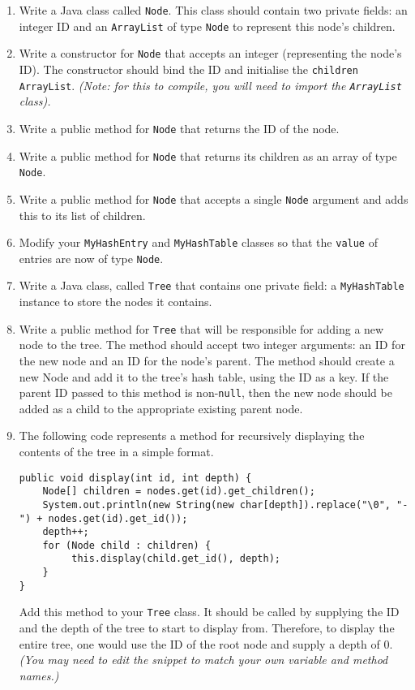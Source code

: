 \documentclass[11pt,a4paper]{report}
\begin{document}
\begin{enumerate}

\item Write a Java class called \texttt{Node}. This class should contain two private fields: an integer ID and an \texttt{ArrayList} of type \texttt{Node} to represent this node's children.

\item Write a constructor for \texttt{Node} that accepts an integer (representing the node's ID). The constructor should bind the ID and initialise the \texttt{children} \texttt{ArrayList}. \textit{(Note: for this to compile, you will need to import the \texttt{ArrayList} class).}

\item Write a public method for \texttt{Node} that returns the ID of the node.

\item Write a public method for \texttt{Node} that returns its children as an array of type \texttt{Node}.

\item Write a public method for \texttt{Node} that accepts a single \texttt{Node} argument and adds this to its list of children.

\item Modify your \texttt{MyHashEntry} and \texttt{MyHashTable} classes so that the \texttt{value} of entries are now of type \texttt{Node}.

\item Write a Java class, called \texttt{Tree} that contains one private field: a \texttt{MyHashTable} instance to store the nodes it contains.

\item Write a public method for \texttt{Tree} that will be responsible for adding a new node to the tree. The method should accept two integer arguments: an ID for the new node and an ID for the node's parent. The method should create a new Node and add it to the tree's hash table, using the ID as a key. If the parent ID passed to this method is non-\texttt{null}, then the new node should be added as a child to the appropriate existing parent node.

\item The following code represents a method for recursively displaying the contents of the tree in a simple format.
\begin{footnotesize}
\begin{verbatim}
public void display(int id, int depth) {
    Node[] children = nodes.get(id).get_children();
    System.out.println(new String(new char[depth]).replace("\0", "-") + nodes.get(id).get_id());
    depth++;
    for (Node child : children) {
         this.display(child.get_id(), depth);
    }
}
\end{verbatim}
\end{footnotesize}
    Add this method to your \texttt{Tree} class. It should be called by supplying the ID and the depth of the tree to start to display from. Therefore, to display the entire tree, one would use the ID of the root node and supply a depth of 0. \textit{(You may need to edit the snippet to match your own variable and method names.)}


\end{enumerate}
\end{document}
